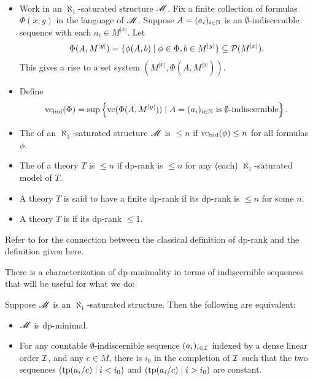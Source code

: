 \begin{Definition} \label{def_dp} \ 
  \begin{itemize}
  \item
    Work in an $\aleph_1$-saturated structure $\mathscr M$.
    Fix a finite collection of formulas $\Phi(x, y)$ in the language of $\mathscr M$.
    Suppose $A = (a_i)_{i \in \mathbb{N}}$ is an $\emptyset$-indiscernible sequence with each $a_i \in M^{|x|}$.
    Let
    \begin{align*}
      \Phi(A, M^{|y|}) = \{\phi(A, b) \mid \phi \in \Phi, b \in M^{|y|}\} \subseteq \mathcal P(M^{|x|}).
    \end{align*}
    This gives a rise to a set system $(M^{|x|}, \Phi(A, M^{|y|}))$.
  \item Define
    \begin{align*}
      \operatorname{vc}_{\operatorname{ind}}(\Phi) = \sup \left\{\operatorname{vc}(\Phi(A, M^{|y|})) \mid A = (a_i)_{i \in \mathbb{N}} \text{ is $\emptyset$-indiscernible}\right\}.
    \end{align*}
  \item The  of an $\aleph_1$-saturated structure $\mathscr M$ is $\leq n$ if $\operatorname{vc}_{\operatorname{ind}}(\phi) \leq n$ for all formulas $\phi$.
  \item The \defn{dp-rank} of a theory $T$ is $\leq n$ if dp-rank is $\leq n$ for any (each) $\aleph_1$-saturated model of $T$.
  \item A theory $T$ is said to have a finite dp-rank if its dp-rank is $\leq n$ for some $n$.
  \item A theory $T$ is \defn{dp-minimal} if its dp-rank $\leq 1$.
  \end{itemize}
\end{Definition}

Refer to \cite{guingona} for the connection between the classical definition of dp-rank and the definition given here.

There is a characterization of dp-minimality in terms of indiscernible sequences that will be useful for what we do:
\begin{Lemma} [see Lemma 1.4 in \cite{simon_dp_min}] \label{dp_min_simon}
  Suppose $\mathscr M$ is an $\aleph_1$-saturated structure.
  Then the following are equivalent:
  \begin{itemize}
  \item $\mathscr M$ is dp-minimal.
  \item For any countable $\emptyset$-indiscernible sequence $(a_i)_{i \in \operatorname{\mathcal I}}$ indexed by a dense linear order $\operatorname{\mathcal I}$,
    and any $c \in M$, there is $i_0$ in the completion of $\operatorname{\mathcal I}$
    such that the two sequences $\left(\operatorname{tp}(a_i/c) \mid i < i_0\right)$ and
    $\left(\operatorname{tp}(a_i/c) \mid i > i_0\right)$ are constant.
  \end{itemize}
\end{Lemma}
